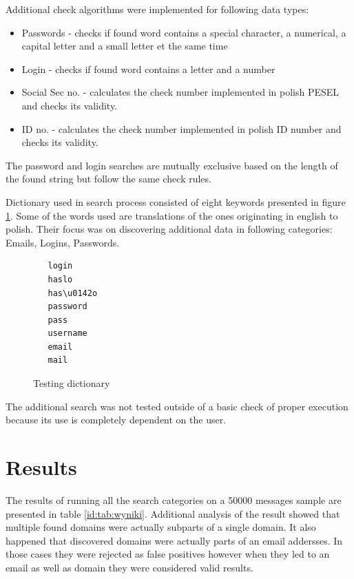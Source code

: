 \documentclass[a4paper,twoside,12pt]{book}
\begin{document}
Additional check algorithms were implemented for following data types:

\begin{itemize}
   \item Passwords - checks if found word contains a special character, a numerical, a capital letter and a small letter et the same time
   \item Login - checks if found word contains a letter and a number
   \item Social Sec no. - calculates the check number implemented in polish PESEL and checks its validity.
   \item ID no. - calculates the check number implemented in polish ID number and checks its validity.
\end{itemize}

The password and login searches are mutually exclusive based on the length of the found string but follow the same
check rules.

Dictionary used in search process consisted of eight keywords presented in figure \ref{fig:dictionary}. 
Some of the words used are translations of the ones originating in english to polish. Their focus was on discovering
additional data in following categories: Emails, Logins, Passwords.

\begin{figure}
   \centering
   \begin{lstlisting}
   login
   haslo
   has\u0142o
   password
   pass
   username
   email
   mail
   \end{lstlisting}
   \caption{Testing dictionary}
   \label{fig:dictionary}
\end{figure}

The additional search was not tested outside of a basic check of proper execution because its use is completely dependent on the user.

\section{Results}

The results of running all the search categories on a 50000 messages sample are presented in table \ref{id:tab:wyniki}.
Additional analysis of the result showed that multiple found domains were actually subparts of a single
domain. It also happened that discovered domains were actually parts of an email addersses. In those cases
they were rejected as false positives however when they led to an email as well as domain they 
were considered valid results. 
\end{document}
